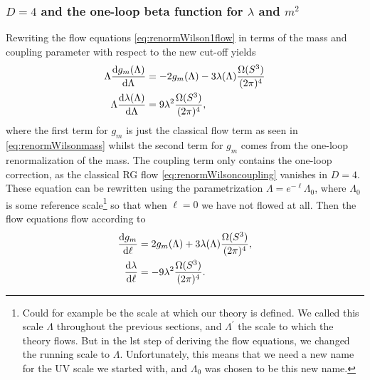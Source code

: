 \subsubsection{$D=4$ and the one-loop beta function for $\lambda$ and $m^2$}
Rewriting the flow equations \ref{eq:renormWilson1flow} in terms of the mass and coupling parameter with respect to the new cut-off yields
\begin{align*}
	\Lambda \frac{\mathrm{d} g_m(\Lambda)}{\mathrm{d} \Lambda }&= -2 g_m(\Lambda) -3 \lambda(\Lambda) \frac{\Omega(S^3)}{(2 \pi)^4}\\
	\Lambda \frac{\mathrm{d} \lambda(\Lambda)}{\mathrm{d} \Lambda} &=9 \lambda^2 \frac{\Omega(S^3)}{(2 \pi)^4},
\end{align*}
where the first term for $g_m$ is just the classical flow term as seen in \ref{eq:renormWilsonmass} whilst the second term for $g_m$ comes from the one-loop renormalization of the mass. The coupling term only contains the one-loop correction, as the classical RG flow \ref{eq:renormWilsoncoupling} vanishes in $D=4$.
\\
These equation can be rewritten using the parametrization $\Lambda = e^{-\ell} \Lambda_0$, where $\Lambda_0$ is some reference scale\footnote{Could for example be the scale at which our theory is defined. We called this scale $\Lambda$ throughout the previous sections, and $\Lambda^\prime$ the scale to which the theory flows. But in the lst step of deriving the flow equations, we changed the running scale to $\Lambda$. Unfortunately, this means that we need a new name for the UV scale we started with, and $\Lambda_0$ was chosen to be this new name.} so that when $\ell=0$ we have not flowed at all. Then the flow equations flow according to
\begin{align}
	\frac{\mathrm{d} g_m}{\mathrm{d} \ell} &=2 g_m (\Lambda) +3 \lambda(\Lambda) \frac{\Omega(S^3)}{(2 \pi)^4},\\
	\frac{\mathrm{d} \lambda}{\mathrm{d} \ell} &= - 9 \lambda^2 \frac{\Omega(S^3)}{(2 \pi)^4}.
\end{align}


